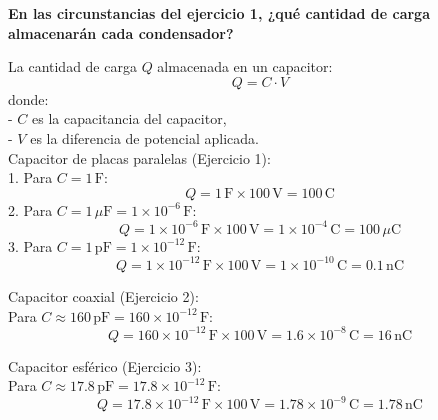 \documentclass[answers]{exam} %
\begin{document}
\begin{questions}
        
     \vspace{0.5cm}
    \question \large\textbf{En las circunstancias del ejercicio 1, ¿qué cantidad de carga almacenarán cada condensador?}
   
        La cantidad de carga \( Q \) almacenada en un capacitor:
        \[
        \boxed{Q = C \cdot V}
        \]
        donde:\\
        - \( C \) es la capacitancia del capacitor,\\
        - \( V \) es la diferencia de potencial aplicada.\\
        
        Capacitor de placas paralelas (Ejercicio 1):\\
        1. Para \( C = 1 \, \text{F} \):
           \[
           Q = 1 \, \text{F} \times 100 \, \text{V} = 100 \, \text{C}
           \]
        2. Para \( C = 1 \, \mu \text{F} = 1 \times 10^{-6} \, \text{F} \):
           \[
           Q = 1 \times 10^{-6} \, \text{F} \times 100 \, \text{V} = 1 \times 10^{-4} \, \text{C} = 100 \, \mu \text{C}
           \]
        3. Para \( C = 1 \, \text{pF} = 1 \times 10^{-12} \, \text{F} \):
           \[
           Q = 1 \times 10^{-12} \, \text{F} \times 100 \, \text{V} = 1 \times 10^{-10} \, \text{C} = 0.1 \, \text{nC}
           \]
        
        Capacitor coaxial (Ejercicio 2):\\
        Para \( C \approx 160 \, \text{pF} = 160 \times 10^{-12} \, \text{F} \):
        \[
        Q = 160 \times 10^{-12} \, \text{F} \times 100 \, \text{V} = 1.6 \times 10^{-8} \, \text{C} = 16 \, \text{nC}
        \]
        
        Capacitor esférico (Ejercicio 3):\\
        Para \( C \approx 17.8 \, \text{pF} = 17.8 \times 10^{-12} \, \text{F} \):
        \[
        Q = 17.8 \times 10^{-12} \, \text{F} \times 100 \, \text{V} = 1.78 \times 10^{-9} \, \text{C} = 1.78 \, \text{nC}
        \]
        
      
        

\end{questions}
\end{document}
